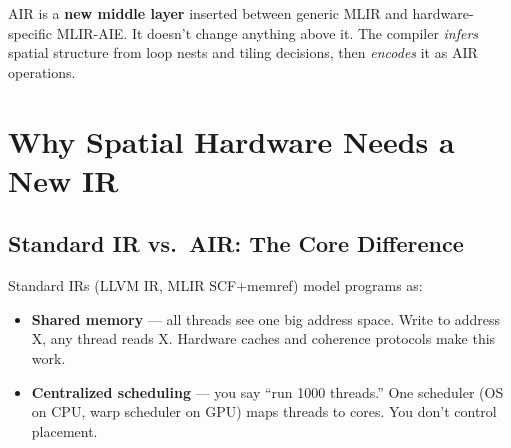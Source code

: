 \documentclass[11pt,a4paper]{article}
\begin{document}
\begin{center}
\end{center}

AIR is a \textbf{new middle layer} inserted between generic MLIR and hardware-specific
MLIR-AIE. It doesn't change anything above it. The compiler \emph{infers} spatial
structure from loop nests and tiling decisions, then \emph{encodes} it as AIR operations.


\section{Why Spatial Hardware Needs a New IR}

\subsection{Standard IR vs.\ AIR: The Core Difference}

Standard IRs (LLVM IR, MLIR SCF+memref) model programs as:
\begin{itemize}[leftmargin=2em]
  \item \textbf{Shared memory} --- all threads see one big address space. Write to
    address X, any thread reads X. Hardware caches and coherence protocols make this
    work.
  \item \textbf{Centralized scheduling} --- you say ``run 1000 threads.'' One
    scheduler (OS on CPU, warp scheduler on GPU) maps threads to cores. You don't
    control placement.
\end{itemize}
\end{document}
